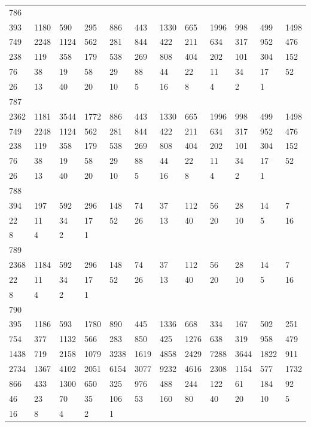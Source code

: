 \begin{longtable}{llllllllllll}
786&&&&&&&&&&&\\
393& 1180& 590& 295& 886& 443& 1330& 665& 1996& 998& 499& 1498\\
749& 2248& 1124& 562& 281& 844& 422& 211& 634& 317& 952& 476\\
238& 119& 358& 179& 538& 269& 808& 404& 202& 101& 304& 152\\
76& 38& 19& 58& 29& 88& 44& 22& 11& 34& 17& 52\\
26& 13& 40& 20& 10& 5& 16& 8& 4& 2& 1& \\

787&&&&&&&&&&&\\
2362& 1181& 3544& 1772& 886& 443& 1330& 665& 1996& 998& 499& 1498\\
749& 2248& 1124& 562& 281& 844& 422& 211& 634& 317& 952& 476\\
238& 119& 358& 179& 538& 269& 808& 404& 202& 101& 304& 152\\
76& 38& 19& 58& 29& 88& 44& 22& 11& 34& 17& 52\\
26& 13& 40& 20& 10& 5& 16& 8& 4& 2& 1& \\

788&&&&&&&&&&&\\
394& 197& 592& 296& 148& 74& 37& 112& 56& 28& 14& 7\\
22& 11& 34& 17& 52& 26& 13& 40& 20& 10& 5& 16\\
8& 4& 2& 1& \\

789&&&&&&&&&&&\\
2368& 1184& 592& 296& 148& 74& 37& 112& 56& 28& 14& 7\\
22& 11& 34& 17& 52& 26& 13& 40& 20& 10& 5& 16\\
8& 4& 2& 1& \\

790&&&&&&&&&&&\\
395& 1186& 593& 1780& 890& 445& 1336& 668& 334& 167& 502& 251\\
754& 377& 1132& 566& 283& 850& 425& 1276& 638& 319& 958& 479\\
1438& 719& 2158& 1079& 3238& 1619& 4858& 2429& 7288& 3644& 1822& 911\\
2734& 1367& 4102& 2051& 6154& 3077& 9232& 4616& 2308& 1154& 577& 1732\\
866& 433& 1300& 650& 325& 976& 488& 244& 122& 61& 184& 92\\
46& 23& 70& 35& 106& 53& 160& 80& 40& 20& 10& 5\\
16& 8& 4& 2& 1& \\


\end{longtable}
